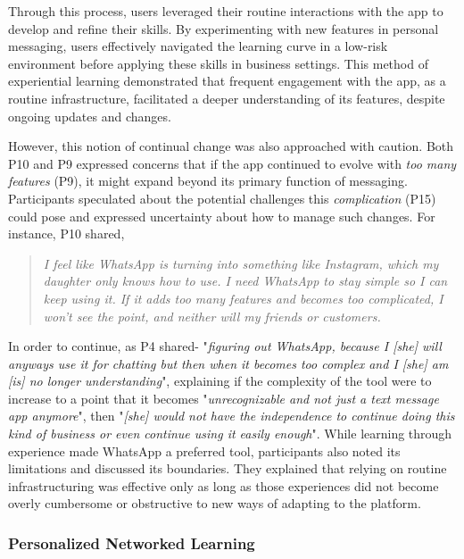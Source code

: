 Through this process, users leveraged their routine interactions with the app to develop and refine their skills. By experimenting with new features in personal messaging, users effectively navigated the learning curve in a low-risk environment before applying these skills in business settings. This method of experiential learning demonstrated that frequent engagement with the app, as a routine infrastructure, facilitated a deeper understanding of its features, despite ongoing updates and changes.


However, this notion of continual change was also approached with caution. Both P10 and P9 expressed concerns that if the app continued to evolve with \textit{too many features} (P9), it might expand beyond its primary function of messaging. Participants speculated about the potential challenges this \textit{complication} (P15) could pose and expressed uncertainty about how to manage such changes. For instance, P10 shared,

\begin{quote}
    \textit{I feel like WhatsApp is turning into something like Instagram, which my daughter only knows how to use. I need WhatsApp to stay simple so I can keep using it. If it adds too many features and becomes too complicated, I won’t see the point, and neither will my friends or customers.}
\end{quote}

In order to continue, as P4 shared- "\textit{figuring out WhatsApp, because I [she] will anyways use it for chatting but then when it becomes too complex and I [she] am [is] no longer understanding}", explaining if the complexity of the tool were to increase to a point that it becomes "\textit{unrecognizable and not just a text message app anymore}", then "\textit{[she] would not have the independence to continue doing this kind of business or even continue using it easily enough}". While learning through experience made WhatsApp a preferred tool, participants also noted its limitations and discussed its boundaries. They explained that relying on routine infrastructuring was effective only as long as those experiences did not become overly cumbersome or obstructive to new ways of adapting to the platform.




\subsubsection{Personalized Networked Learning}


